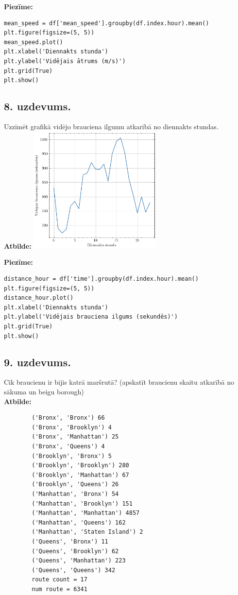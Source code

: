 \documentclass[12pt]{article}
\begin{document}
\noindent \textbf{Piezīme:}
\begin{verbatim}
mean_speed = df['mean_speed'].groupby(df.index.hour).mean()
plt.figure(figsize=(5, 5))
mean_speed.plot()
plt.xlabel('Diennakts stunda')
plt.ylabel('Vidējais ātrums (m/s)')
plt.grid(True)
plt.show()
\end{verbatim}
\subsection*{8. uzdevums.} Uzzīmēt grafikā vidējo brauciena ilgumu atkarībā no diennakts stundas.\\

\noindent \textbf{Atbilde:} \includegraphics[width=0.5\textwidth]{8.uzd.png}

\noindent \textbf{Piezīme:}
\begin{verbatim}
distance_hour = df['time'].groupby(df.index.hour).mean()
plt.figure(figsize=(5, 5))
distance_hour.plot()
plt.xlabel('Diennakts stunda')
plt.ylabel('Vidējais brauciena ilgums (sekundēs)')
plt.grid(True)
plt.show()
\end{verbatim}
\subsection*{9. uzdevums.} Cik braucienu ir bijis katrā maršrutā? (apskatīt braucienu skaitu atkarībā no sākuma un beigu borough) \\
\textbf{Atbilde:} \begin{verbatim}
        ('Bronx', 'Bronx') 66
        ('Bronx', 'Brooklyn') 4
        ('Bronx', 'Manhattan') 25
        ('Bronx', 'Queens') 4
        ('Brooklyn', 'Bronx') 5
        ('Brooklyn', 'Brooklyn') 280
        ('Brooklyn', 'Manhattan') 67
        ('Brooklyn', 'Queens') 26
        ('Manhattan', 'Bronx') 54
        ('Manhattan', 'Brooklyn') 151
        ('Manhattan', 'Manhattan') 4857
        ('Manhattan', 'Queens') 162
        ('Manhattan', 'Staten Island') 2
        ('Queens', 'Bronx') 11
        ('Queens', 'Brooklyn') 62
        ('Queens', 'Manhattan') 223
        ('Queens', 'Queens') 342
        route count = 17
        num route = 6341
\end{verbatim}
\end{document}
